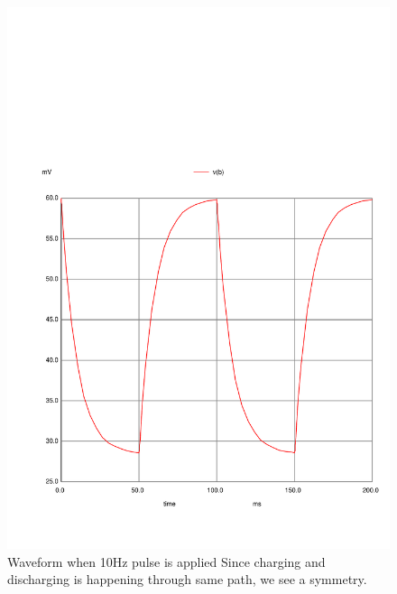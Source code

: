 \documentclass[]{article}
\begin{document}
\begin{figure}[htbp]
\centering
\includegraphics{./plot_10hz.pdf}
\caption{Waveform when 10Hz pulse is applied Since charging and
discharging is happening through same path, we see a symmetry.}
\end{figure}
\end{document}
